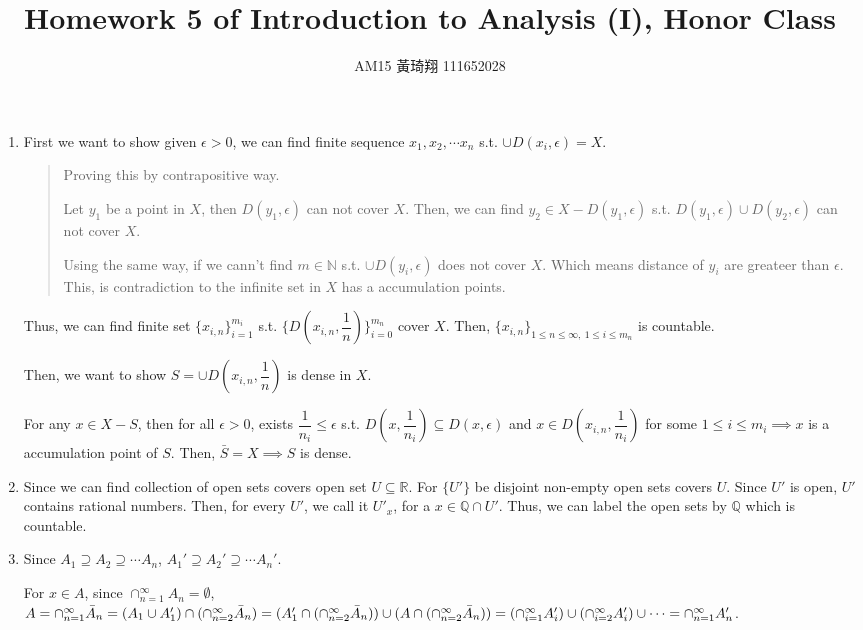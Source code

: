 \documentclass[12pt]{article}
\title{Homework 5 of Introduction to Analysis (I), Honor Class}
\author{AM15 黃琦翔 111652028}
\begin{document}
\maketitle
\begin{enumerate}
    \item First we want to show given $\epsilon > 0$, we can find finite sequence $x_1, x_2, \cdots x_n$ s.t. $\cup D(x_i, \epsilon) = X$.
    \begin{quote}
        Proving this by contrapositive way.

        Let $y_1$ be a point in $X$, then $D(y_1, \epsilon)$ can not cover $X$.
        Then, we can find $y_2\in X-D(y_1, \epsilon)$ s.t. $D(y_1, \epsilon) \cup D(y_2, \epsilon)$ can not cover $X$.

        Using the same way, if we cann't find $m \in \mathbb{N}$ s.t. $\cup D(y_i, \epsilon)$ does not cover $X$. Which means distance of $y_i$ are greateer than $\epsilon$.
        This, is contradiction to the infinite set in $X$ has a accumulation points.
    \end{quote} 

    Thus, we can find finite set $\lbrace x_{i, n}\rbrace_{i=1}^{m_i}$ s.t. $\lbrace D(x_{i, n}, \dfrac{1}{n})\rbrace_{i=0}^{m_n}$ cover $X$.
    Then, $\lbrace x_{i, n}\rbrace_{1\leq n\leq \infty,\ 1\leq i\leq m_n}$ is countable.

    Then, we want to show $S= \cup D(x_{i, n}, \dfrac{1}{n})$ is dense in $X$.

    For any $x\in X-S$, then for all $\epsilon > 0$, exists $\dfrac{1}{n_i} \leq \epsilon$ s.t. $D(x, \dfrac{1}{n_i})\subseteq D(x, \epsilon)$ and
    $x \in D(x_{i, n}, \dfrac{1}{n_i})$ for some $1\leq i \leq m_i\implies x$ is a accumulation point of $S$. Then, $\bar{S} = X\implies S$ is dense.


    \item Since we can find collection of open sets covers open set $U\subseteq \mathbb{R}$.
    For $\lbrace U'\rbrace$ be disjoint non-empty open sets covers $U$.
    Since $U'$ is open, $U'$ contains rational numbers.
    Then, for every $U'$, we call it $U'_x$, for a $x\in \mathbb{Q} \cap U'$.
    Thus, we can label the open sets by $\mathbb{Q}$ which is countable.

    \newpage
    \item Since $A_1 \supseteq A_2\supseteq \cdots A_n$, $A_1' \supseteq A_2'\supseteq \cdots A_n'$.
    
    For $x \in A$, since $\cap_{n=1}^{\infty} A_n = \emptyset$, $A = \cap_{n=1}^{\infty} \bar{A}_n = (A_1\cup A_1') \cap (\cap_{n=2}^{\infty} \bar{A}_n)\\
    = (A_1' \cap (\cap_{n=2}^{\infty} \bar{A}_n)) \cup (A \cap (\cap_{n=2}^{\infty} \bar{A}_n)) = (\cap_{i=1}^{\infty} A_i') \cup (\cap_{i=2}^{\infty} A_i') \cup \cdots = \cap_{n=1}^{\infty} A_n'$.
    

\end{enumerate}
\end{document}
